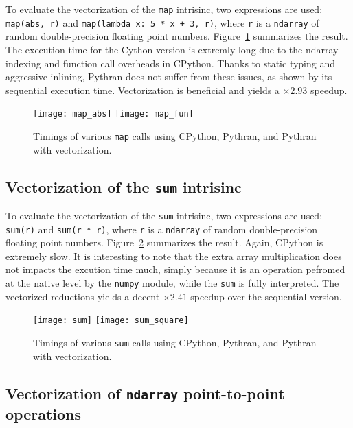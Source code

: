 \documentclass[preprint]{sigplanconf}
\begin{document}
To evaluate the vectorization of the \texttt{map} intrisinc, two expressions
are used: \texttt{map(abs, r)} and \texttt{map(lambda x: 5 * x + 3, r)}, where
\texttt{r} is a \texttt{ndarray} of random double-precision floating point
numbers. Figure~\ref{fig:map-timings} summarizes the result. The execution time
for the Cython version is extremly long due to the ndarray indexing and
function call overheads in CPython. Thanks to static typing and aggressive
inlining, Pythran does not suffer from these issues, as shown by its sequential
execution time. Vectorization is beneficial and yields a $\times2.93$ speedup.

\begin{figure}[ht]

    \texttt{[image: map\_abs]}
    \texttt{[image: map\_fun]}
    \caption{Timings of various \texttt{map} calls using CPython, Pythran, and Pythran with vectorization.}
    \label{fig:map-timings}

\end{figure}

\subsection{Vectorization of the \texttt{sum} intrisinc}

To evaluate the vectorization of the \texttt{sum} intrisinc, two expressions
are used: \texttt{sum(r)} and \texttt{sum(r * r)}, where \texttt{r} is a
\texttt{ndarray} of random double-precision floating point numbers.
Figure~\ref{fig:sum-timings} summarizes the result. Again, CPython is extremely
slow. It is interesting to note that the extra array multiplication does not
impacts the excution time much, simply because it is an operation pefromed at
the native level by the \texttt{numpy} module, while the \texttt{sum} is fully
interpreted. The vectorized reductions yields a decent $\times2.41$ speedup
over the sequential version.

\begin{figure}[ht]

    \texttt{[image: sum]}
    \texttt{[image: sum\_square]}
    \caption{Timings of various \texttt{sum} calls using CPython, Pythran, and Pythran with vectorization.}
    \label{fig:sum-timings}

\end{figure}

\subsection{Vectorization of \texttt{ndarray} point-to-point operations}
\label{sec:bench-numpy}
\end{document}
